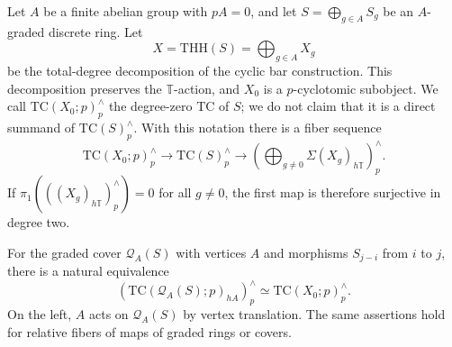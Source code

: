 \begin{lemma}
\label{lem:review-cyclic-zero-tc}
Let $A$ be a finite abelian group with $pA=0$, and let $S=\bigoplus_{g\in A}S_g$ be an $A$-graded discrete ring.
Let
\[
 X=\mathrm{THH}(S)=\bigoplus_{g\in A}X_g
\]
be the total-degree decomposition of the cyclic bar construction.
This decomposition preserves the $\mathbb T$-action, and $X_0$ is a $p$-cyclotomic subobject.
We call $\mathrm{TC}(X_0;p)^\wedge_p$ the degree-zero $\mathrm{TC}$ of $S$; we do not claim that it is a direct summand of $\mathrm{TC}(S)^\wedge_p$.
With this notation there is a fiber sequence
\[
 \mathrm{TC}(X_0;p)^\wedge_p\longrightarrow
 \mathrm{TC}(S)^\wedge_p\longrightarrow
 \left(\bigoplus_{g\ne0}\Sigma(X_g)_{h\mathbb T}\right)^\wedge_p.
\]
If $\pi_1(((X_g)_{h\mathbb T})^\wedge_p)=0$ for all $g\ne0$, the first map is therefore surjective in degree two.

For the graded cover $\mathcal Q_A(S)$ with vertices $A$ and morphisms $S_{j-i}$ from $i$ to $j$, there is a natural equivalence
\[
 \left(\mathrm{TC}(\mathcal Q_A(S);p)_{hA}\right)^\wedge_p
 \simeq\mathrm{TC}(X_0;p)^\wedge_p.
\]
On the left, $A$ acts on $\mathcal Q_A(S)$ by vertex translation.
The same assertions hold for relative fibers of maps of graded rings or covers.
\end{lemma}

